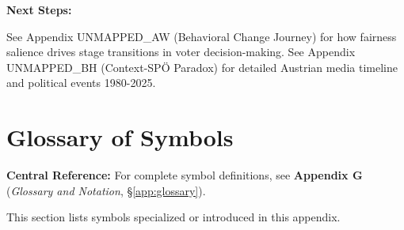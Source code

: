 \begin{tcolorbox}[colback=green!10!white, colframe=green!75!black,
    title=\textbf{Appendix UNMAPPED_CM: Summary}]
\textbf{Next Steps:}

See Appendix UNMAPPED_AW (Behavioral Change Journey) for how fairness salience drives stage transitions
in voter decision-making. See Appendix UNMAPPED_BH (Context-SPÖ Paradox) for detailed Austrian media
timeline and political events 1980-2025.

\end{tcolorbox}

\section{Glossary of Symbols}
\label{sec:cm-glossary}

\begin{tcolorbox}[colback=blue!5!white, colframe=blue!75!black]
\textbf{Central Reference:} For complete symbol definitions, see
\textbf{Appendix G} (\textit{Glossary and Notation}, \S\ref{app:glossary}).

This section lists symbols specialized or introduced in this appendix.
\end{tcolorbox}

\vspace{0.5em}

